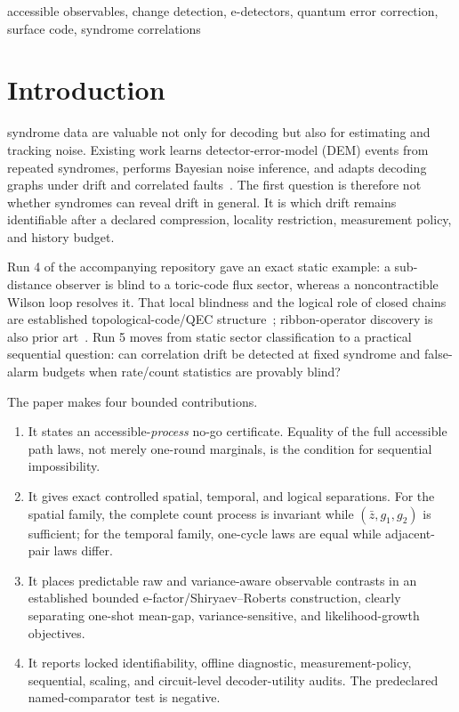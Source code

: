 \documentclass[letterpaper,journal]{IEEEtran}
\begin{document}
\begin{IEEEkeywords}
accessible observables, change detection, e-detectors, quantum error
correction, surface code, syndrome correlations
\end{IEEEkeywords}

\section{Introduction}

 syndrome data are valuable not only for
decoding but also for estimating and tracking noise. Existing work learns
detector-error-model (DEM) events from repeated syndromes, performs Bayesian
noise inference, and adapts decoding graphs under drift and correlated
faults~\cite{wang2023dgr,blumekohout2025,takou2026,kobori2025}. The first
question is therefore not whether syndromes can reveal drift in general. It
is which drift remains identifiable after a declared compression, locality
restriction, measurement policy, and history budget.

Run 4 of the accompanying repository gave an exact static example: a
sub-distance observer is blind to a toric-code flux sector, whereas a
noncontractible Wilson loop resolves it. That local blindness and the logical
role of closed chains are established topological-code/QEC
structure~\cite{kitaev2003,dennis2002,knill1997,bravyi2010}; ribbon-operator
discovery is also prior art~\cite{bridgeman2016}. Run 5 moves from static
sector classification to a practical sequential question: can correlation
drift be detected at fixed syndrome and false-alarm budgets when rate/count
statistics are provably blind?

The paper makes four bounded contributions.
\begin{enumerate}
\item It states an accessible-\emph{process} no-go certificate. Equality of
the full accessible path laws, not merely one-round marginals, is the
condition for sequential impossibility.
\item It gives exact controlled spatial, temporal, and logical separations.
For the spatial family, the complete count process is invariant while
$(\bar z,g_1,g_2)$ is sufficient; for the temporal family, one-cycle laws
are equal while adjacent-pair laws differ.
\item It places predictable raw and variance-aware observable contrasts in an
established bounded e-factor/Shiryaev--Roberts construction, clearly
separating one-shot mean-gap, variance-sensitive, and likelihood-growth
objectives.
\item It reports locked identifiability, offline diagnostic,
measurement-policy, sequential, scaling, and circuit-level decoder-utility
audits. The predeclared named-comparator test is negative.
\end{enumerate}
\end{document}

